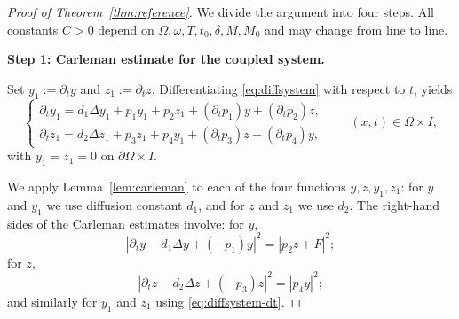 \documentclass[12pt]{amsart}
\theoremstyle{plain}
\theoremstyle{definition}
\theoremstyle{remark}
\newcommand{\p}{\partial}
\newcommand{\Om}{\Omega}
\newcommand{\Lap}{\Delta}
\begin{document}
\begin{proof}[Proof of Theorem~\ref{thm:reference}]
We divide the argument into four steps. All constants $C>0$ depend on $\Omega,\omega,T,t_0,\delta,M,M_0$ and may change from line to line.

\medskip
\noindent\textbf{Step 1: Carleman estimate for the coupled system.}

Set $y_1:=\p_t y$ and $z_1:=\p_t z$.
Differentiating \eqref{eq:diffsystem} with respect to $t$, yields
\begin{equation}\label{eq:diffsystem-dt}
\begin{cases}
\p_t y_1 = d_1\Lap y_1 + p_1 y_1 + p_2 z_1
 + (\p_t p_1) y + (\p_t p_2) z,\\[3pt]
\p_t z_1 = d_2\Lap z_1 + p_3 z_1 + p_4 y_1
 + (\p_t p_3) z + (\p_t p_4) y,
\end{cases}
\qquad (x,t)\in \Omega\times I,
\end{equation}
with $y_1=z_1=0$ on $\p\Om\times I$.

We apply Lemma~\ref{lem:carleman} to each of the four functions $y,z,y_1,z_1$:
for $y$ and $y_1$ we use diffusion constant $d_1$, and for $z$ and $z_1$ we
use $d_2$.
The right-hand sides of the Carleman estimates involve:
for $y$, $$|\p_t y-d_1\Lap y+(-p_1)y|^2=|p_2 z+F|^2;$$
for $z$, $$|\p_t z-d_2\Lap z+(-p_3)z|^2=|p_4 y|^2;$$
and similarly for $y_1$ and $z_1$ using \eqref{eq:diffsystem-dt}.


\end{proof}
\end{document}
